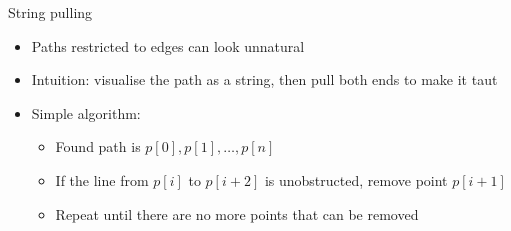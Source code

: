 \begin{frame}{String pulling}
	\begin{itemize}
		\pause\item Paths restricted to edges can look unnatural
		\pause\item Intuition: visualise the path as a string, then pull both ends to make it taut
		\pause\item Simple algorithm:
			\begin{itemize}
				\pause\item Found path is $p[0], p[1], \dots, p[n]$
				\pause\item If the line from $p[i]$ to $p[i+2]$ is unobstructed, remove point $p[i+1]$
				\pause\item Repeat until there are no more points that can be removed
			\end{itemize}
	\end{itemize}
\end{frame}


